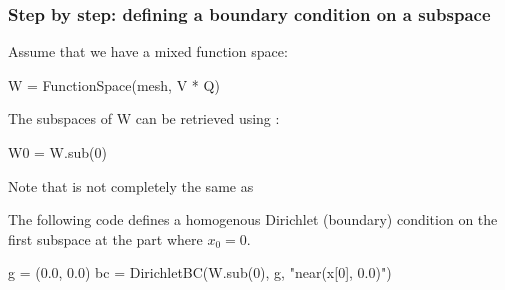 \begin{frame}[fragile]
  \frametitle{Step by step: defining a boundary condition on a subspace}

  Assume that we have a mixed function space:
  \vspace{-1em}
  \begin{python}
W = FunctionSpace(mesh, V * Q)
  \end{python}

\bigskip

The subspaces of W can be retrieved using :
  \vspace{-1em}
  \begin{python}
W0 = W.sub(0)
  \end{python}
Note that  is not completely the same as 

\bigskip

  The following code defines a homogenous Dirichlet (boundary)
  condition on the first subspace at the part where $x_0 = 0$.
  \vspace{-1em}
  \begin{python}
g = (0.0, 0.0)
bc = DirichletBC(W.sub(0), g, "near(x[0], 0.0)")
  \end{python}
\end{frame}
